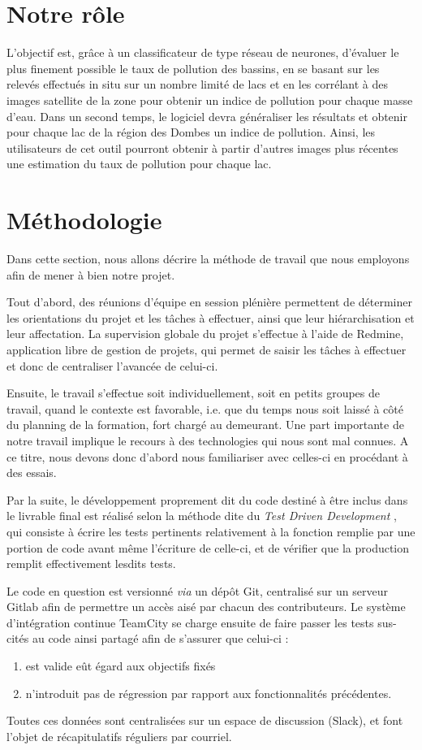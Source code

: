 \documentclass[a4paper, 12pt]{article}
\begin{document}
\section{Notre rôle}
L’objectif est, grâce à un classificateur de type réseau de neurones, d’évaluer le plus finement possible le taux de pollution des bassins, en se basant sur les relevés effectués in situ sur un nombre limité de lacs et en les corrélant à des images satellite de la zone pour obtenir un indice de pollution pour chaque masse d’eau. Dans un second temps, le logiciel devra généraliser les résultats et obtenir pour chaque lac de la région des Dombes un indice de pollution. Ainsi, les utilisateurs de cet outil pourront obtenir à partir d'autres images plus récentes une estimation du taux de pollution pour chaque lac.

\section{Méthodologie}
Dans cette section, nous allons décrire la méthode de travail que nous employons afin de mener à bien notre projet.

Tout d'abord, des réunions d'équipe en session plénière permettent de déterminer les orientations du projet et les tâches à effectuer, ainsi que leur hiérarchisation et leur affectation. La supervision globale du projet s'effectue à l'aide de Redmine, application libre de gestion de projets, qui permet de saisir les tâches à effectuer et donc de centraliser l'avancée de celui-ci.

Ensuite, le travail s'effectue soit individuellement, soit en petits groupes de travail, quand le contexte est favorable, i.e. que du temps nous soit laissé à côté du planning de la formation, fort chargé au demeurant.
Une part importante de notre travail implique le recours à des technologies qui nous sont mal connues. A ce titre, nous devons donc d'abord nous familiariser avec celles-ci en procédant à des essais.

Par la suite, le développement proprement dit du code destiné à être inclus dans le livrable final est réalisé selon la méthode dite du \emph{\og Test Driven Development \fg}, qui consiste à écrire les tests pertinents relativement à la fonction remplie par une portion de code avant même l'écriture de celle-ci, et de vérifier que la production remplit effectivement lesdits tests.

Le code en question est versionné \textit{via} un dépôt Git, centralisé sur un serveur Gitlab afin de permettre un accès aisé par chacun des contributeurs.
Le système d'intégration continue TeamCity se charge ensuite de faire passer les tests sus-cités au code ainsi partagé afin de s'assurer que celui-ci :
\begin{enumerate}
	\item est valide eût égard aux objectifs fixés
	\item n'introduit pas de régression par rapport aux fonctionnalités précédentes.
\end{enumerate}
Toutes ces données sont centralisées sur un espace de discussion (Slack), et font l'objet de récapitulatifs réguliers par courriel.
\end{document}
